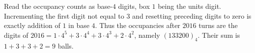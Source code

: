 Read the occupancy counts as base-$4$ digits, box $1$ being the units digit. Incrementing the first digit not equal to $3$ and resetting preceding digits to zero is exactly addition of $1$ in base $4$. Thus the occupancies after $2016$ turns are the digits of $2016=1\cdot4^5+3\cdot4^4+3\cdot4^3+2\cdot4^2$, namely $(133200)_4$. Their sum is $1+3+3+2=\boxed9$ balls.
